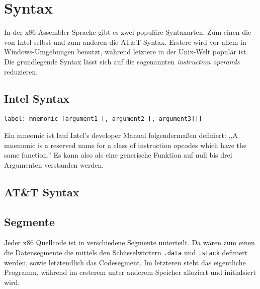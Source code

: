 \section{Syntax}
In der x86 Assembler-Sprache gibt es zwei populäre Syntaxarten.
Zum einen die von Intel selbst und zum anderen die AT\&T-Syntax.
Erstere wird vor allem in Windows-Umgebungen benutzt, während letztere in der Unix-Welt populär ist.
Die grundlegende Syntax lässt sich auf die sogenannten \textit{instruction operands} reduzieren.

\subsection{Intel Syntax}
\texttt{label: mnemonic [argument1 [, argument2 [, argument3]]]}

Ein mneomic ist lauf Intel's developer Manual folgendermaßen definiert:
,,A mnemonic is a reserved name for a class of instruction opcodes which have
the same function.''
Es kann also als eine generische Funktion auf null bis drei Argumenten verstanden werden.

\subsection{AT\&T Syntax}

\subsection{Segmente}
Jeder x86 Quellcode ist in verschiedene Segmente unterteilt. Da wären zum einen die Datensegmente die mittels den Schüsselwörtern \texttt{.data} und \texttt{.stack} definiert werden, sowie letztendlich das Codesegment. Im letzteren steht das eigentliche Programm, während im ersterem unter anderem Speicher alloziert und initialsiert wird.
